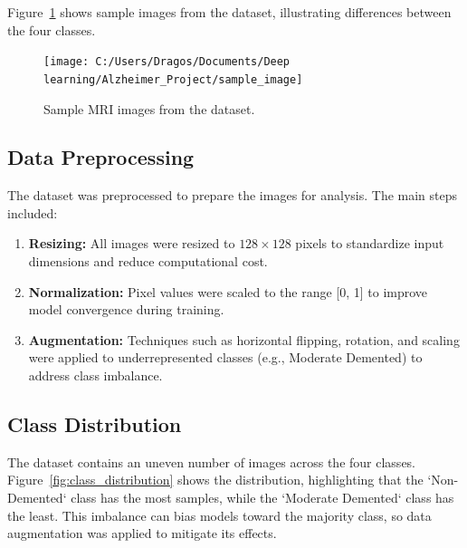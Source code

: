 \documentclass[runningheads]{llncs}
\begin{document}
Figure~\ref{fig:sample_images} shows sample images from the dataset, illustrating differences between the four classes.

\begin{figure}[htbp]
    \centering
    \texttt{[image: C:/Users/Dragos/Documents/Deep learning/Alzheimer\_Project/sample\_image]}
    \caption{Sample MRI images from the dataset.}
    \label{fig:sample_images}
\end{figure}

\subsection{Data Preprocessing}
The dataset was preprocessed to prepare the images for analysis. The main steps included:
\begin{enumerate}
    \item \textbf{Resizing:} All images were resized to $128 \times 128$ pixels to standardize input dimensions and reduce computational cost.
    \item \textbf{Normalization:} Pixel values were scaled to the range [0, 1] to improve model convergence during training.
    \item \textbf{Augmentation:} Techniques such as horizontal flipping, rotation, and scaling were applied to underrepresented classes (e.g., Moderate Demented) to address class imbalance.
\end{enumerate}

\subsection{Class Distribution}
The dataset contains an uneven number of images across the four classes. Figure~\ref{fig:class_distribution} shows the distribution, highlighting that the `Non-Demented` class has the most samples, while the `Moderate Demented` class has the least. This imbalance can bias models toward the majority class, so data augmentation was applied to mitigate its effects.
\end{document}
